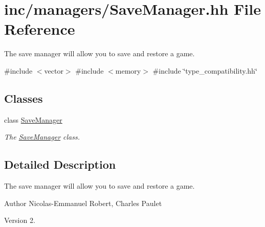 \hypertarget{SaveManager_8hh}{}\section{inc/managers/\+Save\+Manager.hh File Reference}
\label{SaveManager_8hh}


The save manager will allow you to save and restore a game.  


{\ttfamily \#include $<$vector$>$}\newline
{\ttfamily \#include $<$memory$>$}\newline
{\ttfamily \#include \char`\"{}type\+\_\+compatibility.\+hh\char`\"{}}\newline
\subsection*{Classes}
\begin{DoxyCompactItemize}
\item 
class \hyperlink{classSaveManager}{Save\+Manager}
\begin{DoxyCompactList}\small\item\em The \hyperlink{classSaveManager}{Save\+Manager} class. \end{DoxyCompactList}\end{DoxyCompactItemize}


\subsection{Detailed Description}
The save manager will allow you to save and restore a game. 

\begin{DoxyAuthor}{Author}
Nicolas-\/\+Emmanuel Robert, Charles Paulet 
\end{DoxyAuthor}
\begin{DoxyVersion}{Version}
2. 
\end{DoxyVersion}
